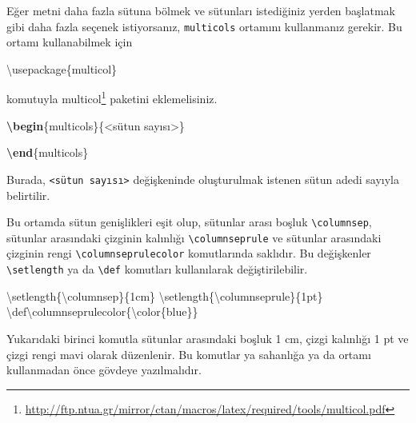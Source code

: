 \documentclass[
  10pt,
]{scrbook}
\newenvironment{Shaded}{\begin{snugshade}}{\end{snugshade}}
\newcommand{\BuiltInTok}[1]{#1}
\newcommand{\ExtensionTok}[1]{#1}
\newcommand{\FunctionTok}[1]{\textcolor[rgb]{0.00,0.00,0.00}{#1}}
\newcommand{\KeywordTok}[1]{\textcolor[rgb]{0.13,0.29,0.53}{\textbf{#1}}}
\newcommand{\NormalTok}[1]{#1}
\renewcommand{\href}[2]{#2\footnote{\url{#1}}}
\theoremstyle{definition}
\theoremstyle{definition}
\theoremstyle{definition}
\theoremstyle{definition}
\theoremstyle{remark}
\begin{document}
Eğer metni daha fazla sütuna bölmek ve sütunları istediğiniz yerden başlatmak gibi daha fazla seçenek istiyorsanız, \texttt{multicols} ortamını kullanmanız gerekir. Bu ortamı kullanabilmek için

\begin{Shaded}
\begin{Highlighting}[]
\BuiltInTok{\textbackslash{}usepackage}\NormalTok{\{}\ExtensionTok{multicol}\NormalTok{\}}
\end{Highlighting}
\end{Shaded}

komutuyla \href{http://ftp.ntua.gr/mirror/ctan/macros/latex/required/tools/multicol.pdf}{multicol} paketini eklemelisiniz.

\begin{Shaded}
\begin{Highlighting}[]
\KeywordTok{\textbackslash{}begin}\NormalTok{\{}\ExtensionTok{multicols}\NormalTok{\}\{\textless{}sütun sayısı\textgreater{}\}}

\KeywordTok{\textbackslash{}end}\NormalTok{\{}\ExtensionTok{multicols}\NormalTok{\}}
\end{Highlighting}
\end{Shaded}

Burada, \texttt{\textless{}sütun\ sayısı\textgreater{}} değişkeninde oluşturulmak istenen sütun adedi sayıyla belirtilir.

Bu ortamda sütun genişlikleri eşit olup, sütunlar arası boşluk \texttt{\textbackslash{}columnsep}, sütunlar arasındaki çizginin kalınlığı \texttt{\textbackslash{}columnseprule} ve sütunlar arasındaki çizginin rengi \texttt{\textbackslash{}columnseprulecolor} komutlarında saklıdır. Bu değişkenler \texttt{\textbackslash{}setlength} ya da \texttt{\textbackslash{}def} komutları kullanılarak değiştirilebilir.

\begin{Shaded}
\begin{Highlighting}[]
\FunctionTok{\textbackslash{}setlength}\NormalTok{\{}\FunctionTok{\textbackslash{}columnsep}\NormalTok{\}\{1cm\}}
\FunctionTok{\textbackslash{}setlength}\NormalTok{\{}\FunctionTok{\textbackslash{}columnseprule}\NormalTok{\}\{1pt\}}
\FunctionTok{\textbackslash{}def\textbackslash{}columnseprulecolor}\NormalTok{\{}\FunctionTok{\textbackslash{}color}\NormalTok{\{blue\}\}}
\end{Highlighting}
\end{Shaded}

Yukarıdaki birinci komutla sütunlar arasındaki boşluk 1 cm, çizgi kalınlığı 1 pt ve çizgi rengi mavi olarak düzenlenir. Bu komutlar ya sahanlığa ya da ortamı kullanmadan önce gövdeye yazılmalıdır.
\end{document}
